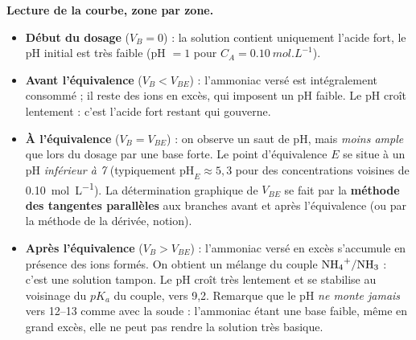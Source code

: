 \documentclass[11pt]{article}
\newcommand{\cle}[1]{{\popxbold\color{popdark}#1}}
\begin{document}
\textbf{Lecture de la courbe, zone par zone.}

\begin{itemize}
\item \textbf{Début du dosage} ($V_B = 0$) : la solution contient uniquement l'acide fort, le pH initial est très faible (pH $= 1$ pour $C_A = \SI{0,10}{mol.L^{-1}}$).
\item \textbf{Avant l'équivalence} ($V_B < V_{BE}$) : l'ammoniac versé est intégralement consommé ; il reste des ions  en excès, qui imposent un pH faible. Le pH croît lentement : c'est l'acide fort restant qui gouverne.
\item \textbf{À l'équivalence} ($V_B = V_{BE}$) : on observe un saut de pH, mais \emph{moins ample} que lors du dosage par une base forte. Le point d'équivalence $E$ se situe à un pH \emph{inférieur à 7} (typiquement $\text{pH}_E \approx 5,3$ pour des concentrations voisines de \SI{0,10}{mol.L^{-1}}). La détermination graphique de $V_{BE}$ se fait par la \textbf{méthode des tangentes parallèles} aux branches avant et après l'équivalence (ou par la méthode de la dérivée, notion).
\item \textbf{Après l'équivalence} ($V_B > V_{BE}$) : l'ammoniac versé en excès s'accumule en présence des ions  formés. On obtient un mélange du couple $\ce{NH4+}/\ce{NH3}$ : c'est une \cle{solution tampon}. Le pH croît très lentement et se stabilise au voisinage du $pK_a$ du couple, vers 9,2. Remarque que le pH \emph{ne monte jamais} vers 12--13 comme avec la soude : l'ammoniac étant une base faible, même en grand excès, elle ne peut pas rendre la solution très basique.
\end{itemize}
\end{document}
